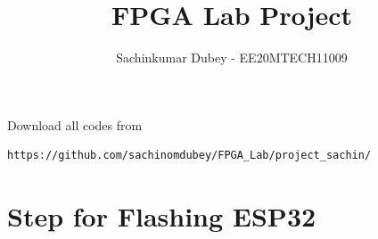 \documentclass[journal,12pt,twocolumn]{IEEEtran}
\begin{document}
     \def\rightbox#1{\makebox[0in][r]{#1}}
     \def\centbox#1{\makebox[0in]{#1}}
     \def\topbox#1{\raisebox{-\baselineskip}[0in][0in]{#1}}
     \def\midbox#1{\raisebox{-0.5\baselineskip}[0in][0in]{#1}}
\vspace{3cm}
\title{FPGA Lab Project}
\author{Sachinkumar Dubey - EE20MTECH11009}
\maketitle
\newpage
\bigskip
\renewcommand{\thefigure}{\theenumi}
\renewcommand{\thetable}{\theenumi}
\noindent Download all codes from 
\begin{lstlisting}
https://github.com/sachinomdubey/FPGA_Lab/project_sachin/
\end{lstlisting}

\section{Step for Flashing ESP32}
\end{document}

